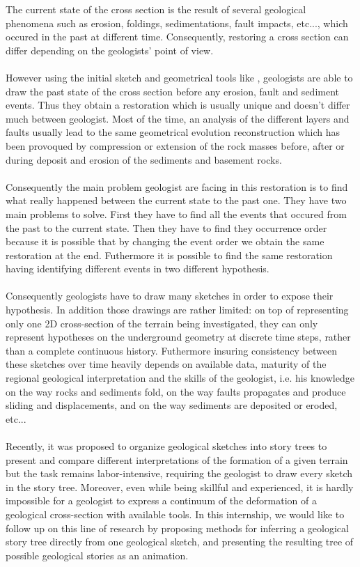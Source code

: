 \documentclass[12pt, a4paper]{report} %
\begin{document}
The current state of the cross section is the result of several geological phenomena such as erosion, foldings, sedimentations, fault impacts, etc..., which occured in the past at different time. Consequently, restoring a cross section can differ depending on the geologists' point of view.\\\\
However using the initial sketch  and geometrical tools like \cite{Move}, geologists are able to draw the past state of the cross section before any erosion, fault and sediment events. Thus they obtain a restoration which is usually unique and doesn't differ much between geologist. 
Most of the time, an analysis of the different layers and faults usually lead to the same geometrical evolution reconstruction which has been provoqued by compression or extension of the rock masses before, after or during deposit and erosion of the sediments and basement rocks. \\\\
Consequently the main problem geologist are facing in this restoration is to find what really happened between the current state to the past one. They have two main problems to solve. First they have to find all the events that occured from the past to the current state. Then they have to find they occurrence order because it is possible that by changing the event order we obtain the same restoration at the end. Futhermore it is possible to find the same restoration having identifying different events in two different hypothesis. \\\\
Consequently geologists have to draw many sketches in order to expose their hypothesis. In addition those drawings are rather limited: on top of representing only one 2D cross-section of the terrain being investigated, they can only represent hypotheses on the underground geometry at discrete time steps, rather than a complete continuous history. Futhermore insuring consistency between these sketches over time heavily depends on available data, maturity of the regional geological interpretation and the skills of the geologist, i.e. his knowledge on the way rocks and sediments fold, on the way faults propagates and produce sliding and displacements, and on the way sediments are deposited or eroded, etc...\\\\
Recently, it was proposed to organize geological sketches into story trees to present and compare different interpretations of the formation of a given terrain \cite{lidal} but the task remains labor-intensive, requiring the geologist to draw every sketch in the story tree. Moreover, even while being skillful and experienced, it is hardly impossible for a geologist to express a continuum of the deformation of a geological cross-section with available tools.
In this internship, we would like to follow up on this line of research by proposing methods for inferring a geological story tree directly from one geological sketch, and presenting the resulting tree of possible geological stories as an animation.\\\\
\end{document}
